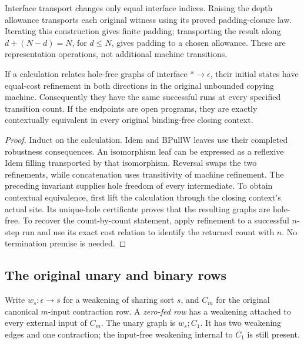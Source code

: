 Interface transport changes only equal interface indices. Raising the depth
allowance transports each original witness using its proved padding-closure
law. Iterating this construction gives finite padding; transporting the
result along $d+(N-d)=N$, for $d\leq N$, gives padding to a chosen allowance.
These are representation operations, not additional machine transitions.

\begin{theorem}
If a calculation relates hole-free graphs of interface $*\to\epsilon$, their
initial states have equal-cost refinement in both directions in the original
unbounded copying machine. Consequently they have the same successful runs
at every specified transition count. If the endpoints are open programs,
they are exactly contextually equivalent in every original binding-free
closing context.
\end{theorem}
\begin{proof}
Induct on the calculation. Idem and BPullW leaves use their completed
robustness consequences. An isomorphism leaf can be expressed as a reflexive
Idem filling transported by that isomorphism. Reversal swaps the two
refinements, while concatenation uses transitivity of machine refinement.
The preceding invariant supplies hole freedom of every intermediate.
To obtain contextual equivalence, first lift the calculation through the
closing context's actual site. Its unique-hole certificate proves that the
resulting graphs are hole-free. To recover the count-by-count statement,
apply refinement to a successful $n$-step run and use its exact cost relation
to identify the returned count with $n$. No termination premise is needed.
\end{proof}

\subsection{The original unary and binary rows}
Write $w_s:\epsilon\to s$ for a weakening of sharing sort $s$, and $C_m$ for
the original canonical $m$-input contraction row. A \emph{zero-fed row} has
a weakening attached to every external input of $C_m$.
The unary graph is $w_s;C_1$. It has two weakening edges and one contraction;
the input-free weakening internal to $C_1$ is still present.

